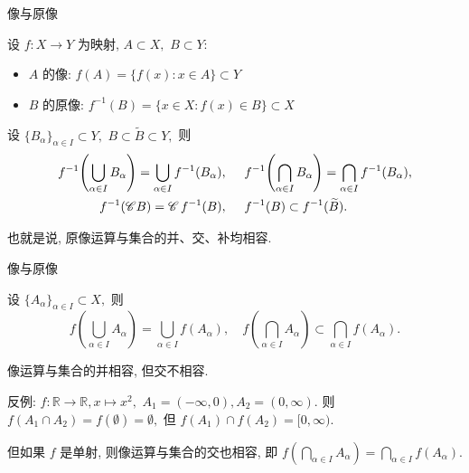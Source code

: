 \begin{frame}{像与原像}

设 $f: X \to Y$ 为映射, $A \subset X,$ $B \subset Y:$

\begin{Def}
\begin{itemize}
  \item $A$ 的\alert{像}: $f(A) = \{ f(x) : x \in A \} \subset Y$
  \item $B$ 的\alert{原像}: $f^{-1}(B) = \{ x \in X : f(x) \in B \} \subset X$
\end{itemize}
\end{Def}

\pause
\vspace{0.3em}

\begin{prop}[原像与集合运算]
设 $\{ B_\alpha \}_{\alpha \in I} \subset Y,$ $B \subset \widetilde{B} \subset Y,$ 则
\begin{align*}
f^{-1}\!\left( \bigcup_{\alpha \in I} B_\alpha \right) = \bigcup_{\alpha \in I} f^{-1}(B_\alpha), & \hspace{1.5em}
f^{-1}\!\left( \bigcap_{\alpha \in I} B_\alpha \right) = \bigcap_{\alpha \in I} f^{-1}(B_\alpha), \\
f^{-1}(\mathscr{C} B) = \mathscr{C}\, f^{-1}(B), & \hspace{1.5em}
f^{-1}(B) \subset f^{-1}(\widetilde{B}).
\end{align*}
\end{prop}

\pause

也就是说, 原像运算与集合的\alert{并、交、补均相容}.

\end{frame}


\begin{frame}{像与原像}

\begin{prop}[像与集合运算]
设 $\{ A_\alpha \}_{\alpha \in I} \subset X,$ 则
\[
f\!\left( \bigcup_{\alpha \in I} A_\alpha \right) = \bigcup_{\alpha \in I} f(A_\alpha), \quad
f\!\left( \bigcap_{\alpha \in I} A_\alpha \right) \subset \bigcap_{\alpha \in I} f(A_\alpha).
\]
\end{prop}

\pause
\vspace{0.5em}

\begin{remark}
像运算与集合的\alert{并相容}, 但\alert{交不相容}.

\pause

{\color{red}} 反例: $f: \mathbb{R} \to \mathbb{R}, x \mapsto x^2,$ $A_1 = (-\infty, 0), A_2 = (0, \infty).$ 则 $f(A_1 \cap A_2) = f(\emptyset) = \emptyset,$ 但 $f(A_1) \cap f(A_2) = [0, \infty)$.

\pause

但如果 $f$ 是\alert{单射}, 则像运算与集合的交也相容, 即 $f\!\left( \bigcap_{\alpha \in I} A_\alpha \right) = \bigcap_{\alpha \in I} f(A_\alpha)$.
\end{remark}

\end{frame}

